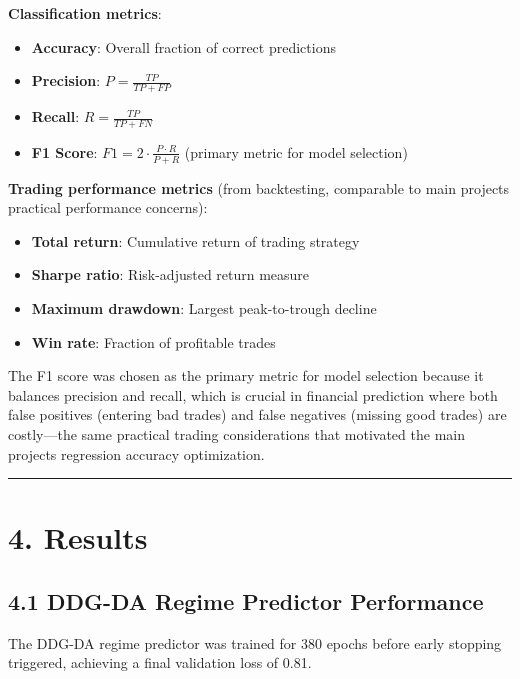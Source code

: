 \documentclass[
]{article}
\begin{document}
\textbf{Classification metrics}:

\begin{itemize}
\item
  \textbf{Accuracy}: Overall fraction of correct predictions
\item
  \textbf{Precision}: $P = \frac{TP}{TP + FP}$
\item
  \textbf{Recall}: $R = \frac{TP}{TP + FN}$
\item
  \textbf{F1 Score}: $F1 = 2 \cdot \frac{P \cdot R}{P + R}$ (primary metric for model selection)
\end{itemize}

\textbf{Trading performance metrics} (from backtesting, comparable to
main project\textquotesingle s practical performance concerns):

\begin{itemize}
\item
  \textbf{Total return}: Cumulative return of trading strategy
\item
  \textbf{Sharpe ratio}: Risk-adjusted return measure
\item
  \textbf{Maximum drawdown}: Largest peak-to-trough decline
\item
  \textbf{Win rate}: Fraction of profitable trades
\end{itemize}

The F1 score was chosen as the primary metric for model selection
because it balances precision and recall, which is crucial in financial
prediction where both false positives (entering bad trades) and false
negatives (missing good trades) are costly---the same practical trading
considerations that motivated the main project\textquotesingle s
regression accuracy optimization.

\begin{center}\rule{0.5\linewidth}{0.5pt}\end{center}

\section{4. Results}\label{4-results}

\subsection{4.1 DDG-DA Regime Predictor
Performance}\label{41-ddg-da-regime-predictor-performance}

The DDG-DA regime predictor was trained for 380 epochs before early
stopping triggered, achieving a final validation loss of 0.81.
\end{document}
